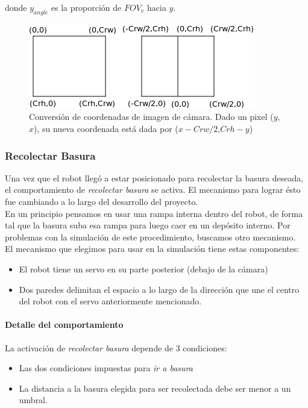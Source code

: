 donde $y_{angle}$ es la proporci\'on de $FOV_v$ hacia $y$.
\begin{figure}[htp]
\begin{center}
\includegraphics[scale=0.5]{comportamientos/figures/imageCoordsConvertion.png}
\caption[Conversi\'on de coordenadas de imagen de c\'amara]{Conversi\'on de
		coordenadas de imagen de c\'amara. Dado un pixel ($y$,$x$), su nueva
		coordenada est\'a dada por ($x-Crw/2$,$Crh-y$)}
\label{fig:image_coord_conv}
\end{center}
\end{figure}

\subsubsection{Recolectar Basura}
\label{collect_garbage}
Una vez que el robot lleg\'o a estar posicionado para recolectar la basura
deseada, el comportamiento de \emph{recolectar basura} se activa. El mecanismo
para lograr \'esto fue cambiando a lo largo del desarrollo del proyecto.
\\\indent
En un principio pensamos en usar una rampa interna dentro del robot, de forma
tal que la basura suba esa rampa para luego caer en un dep\'osito interno.
Por problemas con la simulaci\'on de este procedimiento, buscamos otro
mecanismo.
\\\indent
El mecanismo que elegimos para usar en la simulaci\'on tiene estas componentes:
\begin{itemize}
	\item El robot tiene un servo en su parte posterior (debajo de la c\'amara)
	\item Dos paredes delimitan el espacio a lo largo de la direcci\'on que une
			el centro del robot con el servo anteriormente mencionado.
\end{itemize}

\paragraph{Detalle del comportamiento}
La activaci\'on de \emph{recolectar basura} depende de 3 condiciones:
\begin{itemize}
	\item Las dos condiciones impuestas para \emph{ir a basura}
	\item La distancia a la basura elegida para ser recolectada debe ser menor a
			un umbral.
\end{itemize}

